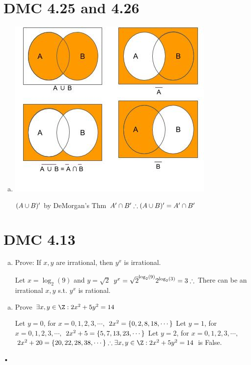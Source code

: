 \documentclass[]{article}
\def\math#1{$#1$}
\begin{document}
\section{DMC 4.25 and 4.26}
\begin{enumerate}[(b)]
\item
\includegraphics[width=\linewidth]{FOCSHW2}

\math{(A\cup B)'
\\} by DeMorgan's Thm
\math{\\ A' \cap B'
\\ \therefore (A\cup B)' = A' \cap B'}
\end{enumerate}

\section{DMC 4.13}
\begin{enumerate}[(l)]
\item Prove: If \math{x, y} are irrational, then $y^x$ is irrational.

Let \math{x = \log_{2} (9)} and \math{y = \sqrt{2}}
\math{\\ y^x = \sqrt{2}^{\log_{2} (9)}
\\ 2^{\log_{2} (3)}
\\ = 3
\\ \therefore} There can be an irrational \math{x, y} s.t. \math{y^x} is rational.

\end{enumerate}
\begin{enumerate}[(o)]
\item Prove \math{\exists x, y\in \Z : 2x^2+5y^2=14}

Let \math{y=0}, for \math{x = 0, 1, 2, 3, \cdots ,} \math{2x^2 = \{ 0, 2, 8, 18, \cdots \}\\}
Let \math{y=1}, for \math{x = 0, 1, 2, 3, \cdots ,} \math{2x^2 + 5 = \{ 5, 7, 13, 23, \cdots \}\\}
Let \math{y=2}, for \math{x = 0, 1, 2, 3, \cdots ,} \math{2x^2 + 20 = \{ 20, 22, 28, 38, \cdots \}\\
\therefore \exists x, y\in \Z : 2x^2+5y^2=14} is False.

\end{enumerate}•
\end{document}

